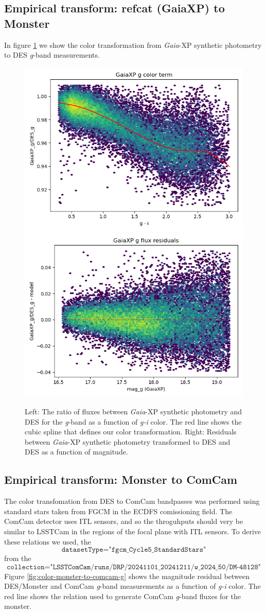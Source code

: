 \subsection{Empirical transform: refcat (GaiaXP) to Monster}
\label{sec:todes}
In figure \ref{fig:color-xp-g} we show the color transformation from \emph{Gaia}-XP synthetic photometry to DES \textit{g}-band measurements.
\begin{figure}
    \includegraphics[width=0.49\linewidth]{./figures/color_terms/GaiaXP_to_DES_band_g_color_term.png}
    \includegraphics[width=0.49\linewidth]{./figures/color_terms/GaiaXP_to_DES_band_g_flux_residuals.png}
    \caption{Left: The ratio of fluxes between \emph{Gaia}-XP synthetic photometry and DES for the \textit{g}-band as a function of \textit{g-i} color. The red line shows the cubic spline that defines our color transformation.
    Right: Residuals between \emph{Gaia}-XP synthetic photometry transformed to DES and DES as a function of magnitude.}
    \label{fig:color-xp-g}
\end{figure}


\subsection{Empirical transform: Monster to ComCam}
\label{sec:tocomcam}
The color transfomation from DES to ComCam bandpasses was performed using standard stars taken from FGCM in the ECDFS comissioning field. 
The ComCam detector uses ITL sensors, and so the throguhputs should very be similar to LSSTCam in the regions of the focal plane with ITL sensors. 
To derive these relations we used, the $$\texttt{datasetType="fgcm\_Cycle5\_StandardStars"}$$ from the $$\texttt{collection="LSSTComCam/runs/DRP/20241101\_20241211/w\_2024\_50/DM-48128"}$$
Figure \ref{fig:color-monster-to-comcam-g} shows the magnitude residual between DES/Monster and ComCam \textit{g}-band measurements as a function of \textit{g-i} color. 
The red line shows the relation used to generate ComCam \textit{g}-band fluxes for the monster.


